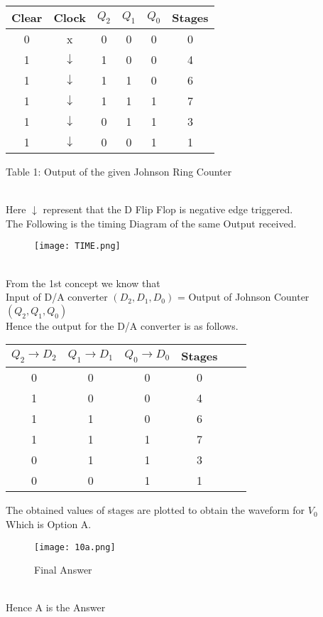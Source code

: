 \documentclass{article}
\begin{document}
\begin{center}
\begin{tabular}{ |c|c|c|c|c|c| }
\hline
Clear&Clock&${Q_2}$&${Q_1}$&${Q_0}$&Stages\\
\hline
0&x&0&0&0&0\\
1&$\downarrow$&1&0&0&4\\
1&$\downarrow$&1&1&0&6\\
1&$\downarrow$&1&1&1&7\\
1&$\downarrow$&0&1&1&3\\
1&$\downarrow$&0&0&1&1\\
\hline
\end{tabular}
\end{center}
\begin{center}
Table 1: Output of the given Johnson Ring Counter
\end{center}
\\
Here $\downarrow$ represent that the D Flip Flop is negative edge triggered.\\
The Following is the timing Diagram of the same Output received.\\
\begin{figure}[htp]
    \centering
     \texttt{[image: TIME.png]}
\end{figure}
\\
From the 1st concept we know that \\Input of D/A converter $(D_2,D_1,D_0)$ = Output of Johnson Counter $(Q_2,Q_1,Q_0)$\\
Hence the output for the D/A converter is as follows.
\begin{center}
\begin{tabular}{ |c|c|c|c|c|c| }
\hline
${Q_2}$$\rightarrow$${D_2}$&${Q_1}$$\rightarrow$${D_1}$&${Q_0}$$\rightarrow$${D_0}$&Stages\\
\hline
0&0&0&0\\
1&0&0&4\\
1&1&0&6\\
1&1&1&7\\
0&1&1&3\\
0&0&1&1\\
\hline
\end{tabular}
\end{center}
The obtained values of stages are plotted to obtain the waveform for $V_0$
\\
Which is Option A.\\
\begin{figure}[htp]
    \centering
     \texttt{[image: 10a.png]}
     \caption{Final Answer}
\end{figure}\\
\Large
Hence A is the Answer
\end{document}
